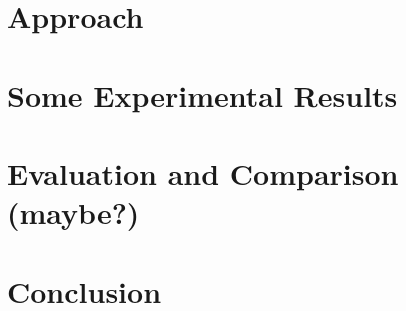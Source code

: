 \documentclass[english]{llncs}
\begin{document}
\section{Approach}
\label{section:approach}


\section{Some Experimental Results}
\label{section:results}


\section{Evaluation and Comparison (maybe?)}
\label{section:evaluation-comparison}


\section{Conclusion}
\label{section:conclusion}





\begin{acronym}[ICP]
\end{acronym}
\end{document}
